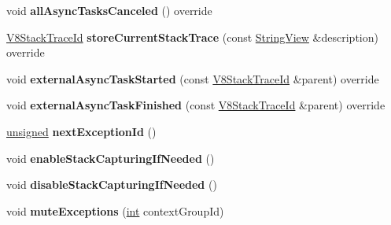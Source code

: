 \begin{DoxyCompactItemize}
\item 
\mbox{\label{classv8__inspector_1_1V8InspectorImpl_aa875bed2aee38eb9b816fd837d5494c9}} 
void {\bfseries all\+Async\+Tasks\+Canceled} () override
\item 
\mbox{\label{classv8__inspector_1_1V8InspectorImpl_aa6a8e077522d48542d90d30faea5fa70}} 
\mbox{\hyperlink{structv8__inspector_1_1V8StackTraceId}{V8\+Stack\+Trace\+Id}} {\bfseries store\+Current\+Stack\+Trace} (const \mbox{\hyperlink{classv8__inspector_1_1StringView}{String\+View}} \&description) override
\item 
\mbox{\label{classv8__inspector_1_1V8InspectorImpl_ac595ac728083b84816f6db8d31e39ca9}} 
void {\bfseries external\+Async\+Task\+Started} (const \mbox{\hyperlink{structv8__inspector_1_1V8StackTraceId}{V8\+Stack\+Trace\+Id}} \&parent) override
\item 
\mbox{\label{classv8__inspector_1_1V8InspectorImpl_a035a1d2fc2fe546013221a786f84b152}} 
void {\bfseries external\+Async\+Task\+Finished} (const \mbox{\hyperlink{structv8__inspector_1_1V8StackTraceId}{V8\+Stack\+Trace\+Id}} \&parent) override
\item 
\mbox{\label{classv8__inspector_1_1V8InspectorImpl_abb07d0980fde769adcdd755f93cf34d2}} 
\mbox{\hyperlink{classunsigned}{unsigned}} {\bfseries next\+Exception\+Id} ()
\item 
\mbox{\label{classv8__inspector_1_1V8InspectorImpl_a1b74c8243c41c0e5d6288c5069a54e6f}} 
void {\bfseries enable\+Stack\+Capturing\+If\+Needed} ()
\item 
\mbox{\label{classv8__inspector_1_1V8InspectorImpl_a279aae16f5bd65893831a4d7fcadfa4e}} 
void {\bfseries disable\+Stack\+Capturing\+If\+Needed} ()
\item 
\mbox{\label{classv8__inspector_1_1V8InspectorImpl_ad986fef47ea436a17f5f4fb662995461}} 
void {\bfseries mute\+Exceptions} (\mbox{\hyperlink{classint}{int}} context\+Group\+Id)

\end{DoxyCompactItemize}
